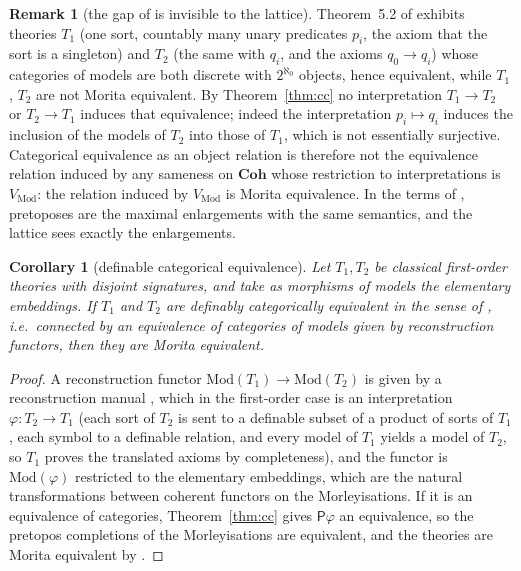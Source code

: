 \documentclass[11pt]{amsart}
\newtheorem{cor}[thm]{Corollary}
\theoremstyle{definition}
\newtheorem{rem}[thm]{Remark}
\newcommand{\Coh}{\mathbf{Coh}}
\newcommand{\Mod}{\mathrm{Mod}}
\newcommand{\PP}{\mathsf P}
\begin{document}
\begin{rem}[the gap of \cite{BH16} is invisible to the lattice]\label{rem:bhgap}
Theorem~5.2 of \cite{BH16} exhibits theories $T_1$ (one sort, countably
many unary predicates $p_i$, the axiom that the sort is a singleton) and
$T_2$ (the same with $q_i$, and the axioms $q_0\to q_i$) whose
categories of models are both discrete with $2^{\aleph_0}$ objects,
hence equivalent, while $T_1$, $T_2$ are not Morita equivalent. By
Theorem~\ref{thm:cc} no interpretation $T_1\to T_2$ or $T_2\to T_1$
induces that equivalence; indeed the interpretation $p_i\mapsto q_i$
induces the inclusion of the models of $T_2$ into those of $T_1$, which
is not essentially surjective. Categorical equivalence as an object
relation is therefore not the equivalence relation induced by any
sameness on $\Coh$ whose restriction to interpretations is $V_{\Mod}$:
the relation induced by $V_{\Mod}$ is Morita equivalence. In the terms
of \cite[Rem.~13]{LurieNotes}, pretoposes are the maximal enlargements
with the same semantics, and the lattice sees exactly the enlargements.
\end{rem}

\begin{cor}[definable categorical equivalence]\label{cor:hudetz}
Let $T_1,T_2$ be classical first-order theories with disjoint
signatures, and take as morphisms of models the elementary embeddings.
If $T_1$ and $T_2$ are definably categorically equivalent in the sense
of \cite[Def.~4]{Hudetz19}, i.e.\ connected by an equivalence of
categories of models given by reconstruction functors, then they are
Morita equivalent.
\end{cor}
\begin{proof}
A reconstruction functor $\Mod(T_1)\to\Mod(T_2)$ is given by a
reconstruction manual \cite[Def.~5--7]{Hudetz19}, which in the
first-order case is an interpretation $\varphi\colon T_2\to T_1$ (each
sort of $T_2$ is sent to a definable subset of a product of sorts of
$T_1$, each symbol to a definable relation, and every model of $T_1$
yields a model of $T_2$, so $T_1$ proves the translated axioms by
completeness), and the functor is $\Mod(\varphi)$ restricted to the
elementary embeddings, which are the natural transformations between
coherent functors on the Morleyisations. If it is an equivalence of
categories, Theorem~\ref{thm:cc} gives $\PP\varphi$ an equivalence, so
the pretopos completions of the Morleyisations are equivalent, and the
theories are Morita equivalent by \cite[Thm.~5.4]{Tsem17}.
\end{proof}
\end{document}
